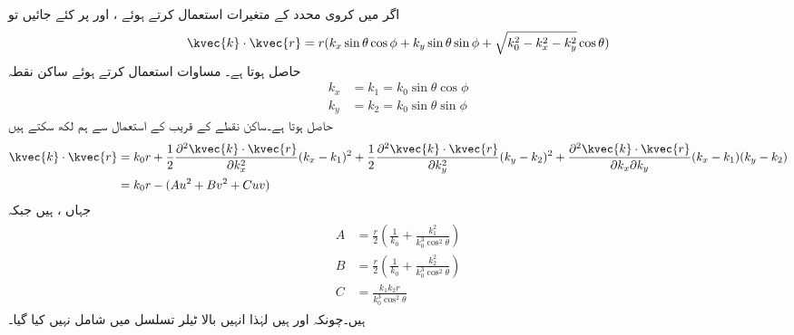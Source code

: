 اگر  میں کروی محدد کے متغیرات استعمال کرتے ہوئے ،  اور  پر کئے جائیں تو
\begin{align}
\kvec{k}\cdot\kvec{r}=r(k_x \sin\theta\cos\phi+k_y\sin\theta\sin\phi+\sqrt{k_0^2-k_x^2-k_y^2}\cos \theta)
\end{align}
حاصل ہوتا ہے۔ مساوات  استعمال کرتے ہوئے ساکن نقطہ
\begin{align}
k_x&=k_1=k_0 \sin\theta\cos\phi\\
k_y&=k_2=k_0\sin\theta\sin\phi
\end{align}
حاصل ہوتا ہے۔ساکن نقطے کے قریب  کے استعمال سے ہم لکھ سکتے ہیں
\begin{align*}
\kvec{k}\cdot\kvec{r}&=k_0 r +\frac{1}{2}\frac{\partial^2 \kvec{k}\cdot\kvec{r}  }{\partial k_x^2} (k_x-k_1)^2+\frac{1}{2}\frac{\partial^2 \kvec{k}\cdot\kvec{r}  }{\partial k_y^2} (k_y-k_2)^2+\frac{\partial^2 \kvec{k}\cdot\kvec{r}  }{\partial k_x \partial k_y} (k_x-k_1)(k_y-k_2)\\
&=k_0 r-(A u^2+B v^2+C u v)
\end{align*}
جہاں ،  ہیں جبکہ
\begin{gather}
\begin{aligned}\label{مساوات_اینٹینا_ساکن_نقطہ_مستقل}
A&=\frac{r}{2}\left(\frac{1}{k_0}+\frac{k_1^2}{k_0^3 \cos^2 \theta}\right)\\
B&=\frac{r}{2}\left(\frac{1}{k_0}+\frac{k_2^2}{k_0^3 \cos^2 \theta}\right)\\
C&=\frac{k_1 k_2 r}{k_0^3 \cos^2 \theta}
\end{aligned}
\end{gather}
ہیں۔چونکہ  اور  ہیں لہٰذا  انہیں بالا ٹیلر تسلسل میں شامل نہیں کیا گیا۔


